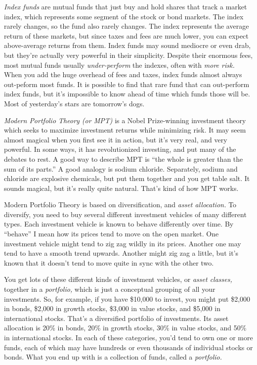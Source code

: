 \emph{Index funds} are mutual funds that just buy and hold shares that track a market index, which represents some segment of the stock or bond markets. The index rarely changes, so the fund also rarely changes. The index represents the average return of these markets, but since taxes and fees are much lower, you can expect above-average returns from them. Index funds may sound mediocre or even drab, but they're actually very powerful in their simplicity. Despite their enormous fees, most mutual funds usually \emph{under-perform} the indexes, often with \emph{more risk.} When you add the huge overhead of fees and taxes, index funds almost always out-peform most funds. It is possible to find that rare fund that can out-perform index funds, but it's impossible to know ahead of time which funds those will be. Most of yesterday's stars are tomorrow's dogs.

\emph{Modern Portfolio Theory (or MPT)} is a Nobel Prize-winning investment theory which seeks to maximize investment returns while minimizing risk. It may seem almost magical when you first see it in action, but it's very real, and very powerful. In some ways, it has revolutionized investing, and put many of the debates to rest. A good way to describe MPT is ``the whole is greater than the sum of its parts.'' A good analogy is sodium chloride. Separately, sodium and chloride are explosive chemicals, but put them together and you get table salt. It sounds magical, but it's really quite natural. That's kind of how MPT works.

Modern Portfolio Theory is based on diversification, and \emph{asset allocation.} To diversify, you need to buy several different investment vehicles of many different types. Each investment vehicle is known to behave differently over time. By ``behave'' I mean how its prices tend to move on the open market. One investment vehicle might tend to zig zag wildly in its prices. Another one may tend to have a smooth trend upwards. Another might zig zag a little, but it's known that it doesn't tend to move quite in sync with the other two.

You get lots of these different kinds of investment vehicles, or \emph{asset classes,} together in a \emph{portfolio,} which is just a conceptual grouping of all your investments. So, for example, if you have \$10,000 to invest, you might put \$2,000 in bonds, \$2,000 in growth stocks, \$3,000 in value stocks, and \$5,000 in international stocks. That's a diversified portfolio of investments. Its asset allocation is 20\% in bonds, 20\% in growth stocks, 30\% in value stocks, and 50\% in international stocks. In each of these categories, you'd tend to own one or more funds, each of which may have hundreds or even thousands of individual stocks or bonds. What you end up with is a collection of funds, called a \emph{portfolio.}

